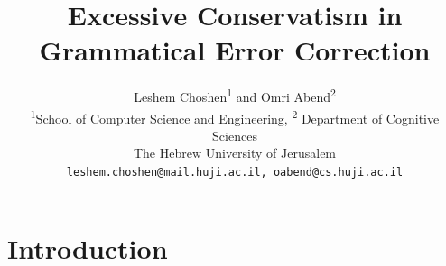 \documentclass[english]{article}
\begin{document}
	
	\title{Excessive Conservatism in Grammatical Error Correction}
	
	\author{
		Leshem Choshen\textsuperscript{1} and Omri Abend\textsuperscript{2} \\
		\textsuperscript{1}School of Computer Science and Engineering,
                \textsuperscript{2} Department of Cognitive Sciences \\
		The Hebrew University of Jerusalem \\
		\texttt{leshem.choshen@mail.huji.ac.il, oabend@cs.huji.ac.il}\\
	}
	

\maketitle

\begin{abstract}
	
\end{abstract}

\section{Introduction}



\end{document}
